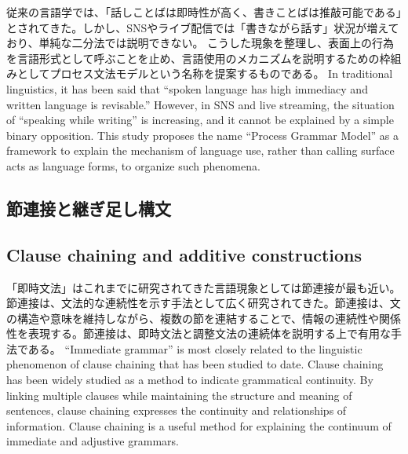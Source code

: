 \documentclass[a4paper]{article}
\begin{document}
\ifJPN
従来の言語学では、「話しことばは即時性が高く、書きことばは推敲可能である」とされてきた。しかし、SNSやライブ配信では「書きながら話す」状況が増えており、単純な二分法では説明できない。
こうした現象を整理し、表面上の行為を言語形式として呼ぶことを止め、言語使用のメカニズムを説明するための枠組みとしてプロセス文法モデルという名称を提案するものである。
\else
In traditional linguistics, it has been said that ``spoken language has high immediacy and written language is revisable.'' However, in SNS and live streaming, the situation of ``speaking while writing'' is increasing, and it cannot be explained by a simple binary opposition.
This study proposes the name ``Process Grammar Model'' as a framework to explain the mechanism of language use, rather than calling surface acts as language forms, to organize such phenomena.
\fi

\ifJPN
  \subsection{節連接と継ぎ足し構文}
\else
  \subsection{Clause chaining and additive constructions}
\fi

\ifJPN
「即時文法」はこれまでに研究されてきた言語現象としては節連接が最も近い。
節連接は、文法的な連続性を示す手法として広く研究されてきた。節連接は、文の構造や意味を維持しながら、複数の節を連結することで、情報の連続性や関係性を表現する。節連接は、即時文法と調整文法の連続体を説明する上で有用な手法である。
\else
``Immediate grammar'' is most closely related to the linguistic phenomenon of clause chaining that has been studied to date. Clause chaining has been widely studied as a method to indicate grammatical continuity. By linking multiple clauses while maintaining the structure and meaning of sentences, clause chaining expresses the continuity and relationships of information. Clause chaining is a useful method for explaining the continuum of immediate and adjustive grammars.
\fi
\end{document}
